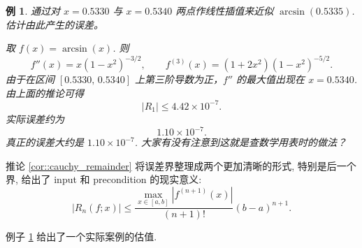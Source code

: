 \documentclass[a4paper]{ctexart}
\newtheorem{example}[theorem]{例}
\numberwithin{theorem}{section}
\numberwithin{equation}{section}
\numberwithin{figure}{section}
\numberwithin{remark}{section}
\begin{document}
\begin{example}
    \label{exp::arcsin}
通过对 $x=0.5330$ 与 $x=0.5340$ 两点作线性插值来近似 $\arcsin(0.5335)$. 估计由此产生的误差。

取 $f(x)=\arcsin(x)$. 则
\begin{equation*}
f''(x)=x(1-x^{2})^{-3/2},\qquad
f^{(3)}(x)=(1+2x^{2})(1-x^{2})^{-5/2}.
\end{equation*}
由于在区间 $[0.5330,\,0.5340]$ 上第三阶导数为正，$f''$ 的最大值出现在 $x=0.5340$. 
由上面的推论可得
\begin{equation*}
\lvert R_1\rvert \le 4.42\times 10^{-7}.
\end{equation*}
实际误差约为
\begin{equation*}
1.10\times 10^{-7}.
\end{equation*}
真正的误差大约是 $1.10 \times 10^{-7}$. 大家有没有注意到这就是查数学用表时的做法？
\end{example}

推论 \ref{cor::cauchy_remainder} 将误差界整理成两个更加清晰的形式, 特别是后一个界, 给出了
input 和 precondition 的现实意义:
$$
|R_n(f; x)| \leq
\frac{\max_{x \in [a, b]}\left|f^{(n + 1)}(x)\right|}{(n + 1)!}(b - a)^{n + 1}.
$$

例子 \ref{exp::arcsin} 给出了一个实际案例的估值.
\end{document}
